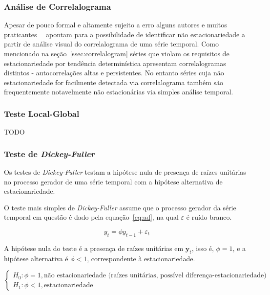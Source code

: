 \subsubsection{Análise de Correlalograma}

Apesar de pouco formal e altamente sujeito a erro alguns autores e muitos
praticantes~\cite{chatfield}~\cite{metcalfe} apontam para a possibilidade de
identificar não estacionariedade a partir de análise visual do correlalograma
de uma série temporal. Como mencionado na seção~\ref{ssec:correlalogram}
séries que violam os requisitos de estacionariedade por tendência
determinística apresentam correlalogramas distintos -
autocorrelações altas e persistentes. No entanto séries cuja não
estacionariedade for facilmente detectada via correlalograma também são
frequentemente notavelmente não estacionárias via simples análise temporal.

\subsubsection{Teste Local-Global}

TODO

\subsubsection{Teste de \emph{Dickey-Fuller}}

Os testes de \emph{Dickey-Fuller} testam a hipótese nula de presença de raízes
unitárias no processo gerador de uma série temporal com a hipótese alternativa
de estacionariedade.

O teste mais simples de \emph{Dickey-Fuller} assume que o processo gerador da
série temporal em questão é dado pela equação~\ref{eq:ad}, na qual
$\varepsilon$ é ruído branco.

\begin{equation}\label{eq:ad}
    y_t = \phi y_{t-1} + \varepsilon_t
\end{equation}

A hipótese nula do teste é a presença de raízes unitárias em $\mathbf{y}_t$,
isso é, $\phi = 1$, e a hipótese alternativa é $\phi < 1$, correspondente à
estacionariedade.

$$
\begin{cases}
    H_0: \phi = 1, \text{não estacionariedade (raízes unitárias, possível diferença-estacionariedade)} \\
    H_1: \phi < 1, \text{estacionariedade}
\end{cases}
$$

